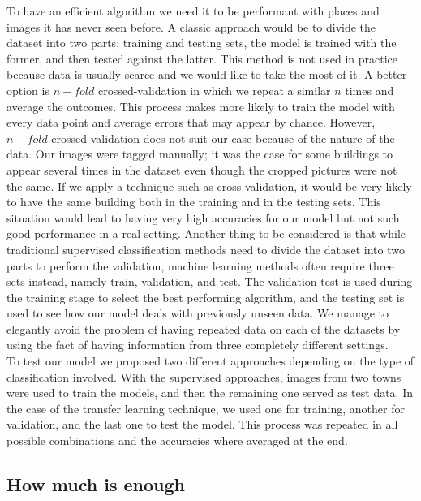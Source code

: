To have an efficient algorithm we need it to be performant with places and images it has never seen before. A classic approach would be to divide the dataset into two parts; training and testing sets, the model is trained with the former, and then tested against the latter. This method is not used in practice because data is usually scarce and we would like to take the most of it. A better option is $n-fold$ crossed-validation in which we repeat a similar $n$ times and average the outcomes. This process makes more likely to train the model with every data point and average errors that may appear by chance. However, $n-fold$ crossed-validation does not suit our case because of the nature of the data. Our images were tagged manually; it was the case for some buildings to appear several times in the dataset even though the cropped pictures were not the same. If we apply a technique such as cross-validation, it would be very likely to have the same building both in the training and in the testing sets. This situation would lead to having very high accuracies for our model but not such good performance in a real setting. Another thing to be considered is that while traditional supervised classification methods need to divide the dataset into two parts to perform the validation, machine learning methods often require three sets instead, namely train, validation,  and test. The validation test is used during the training stage to select the best performing algorithm, and the testing set is used to see how our model deals with previously unseen data. We manage to elegantly avoid the problem of having repeated data on each of the datasets by using the fact of having information from three completely different settings.\\

To test our model we proposed two different approaches depending on the type of classification involved. With the supervised approaches, images from two towns were used to train the models, and then the remaining one served as test data. In the case of the transfer learning technique, we used one for training, another for validation, and the last one to test the model. This process was repeated in all possible combinations and the accuracies where averaged at the end.\\

\subsection{How much is enough}


